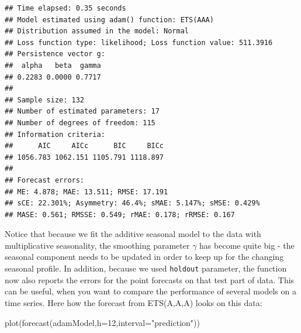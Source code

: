 \documentclass[
]{book}
\newenvironment{Shaded}{\begin{snugshade}}{\end{snugshade}}
\newcommand{\AttributeTok}[1]{\textcolor[rgb]{0.77,0.63,0.00}{#1}}
\newcommand{\ConstantTok}[1]{\textcolor[rgb]{0.00,0.00,0.00}{#1}}
\newcommand{\DecValTok}[1]{\textcolor[rgb]{0.00,0.00,0.81}{#1}}
\newcommand{\FloatTok}[1]{\textcolor[rgb]{0.00,0.00,0.81}{#1}}
\newcommand{\FunctionTok}[1]{\textcolor[rgb]{0.00,0.00,0.00}{#1}}
\newcommand{\NormalTok}[1]{#1}
\newcommand{\OtherTok}[1]{\textcolor[rgb]{0.56,0.35,0.01}{#1}}
\newcommand{\SpecialCharTok}[1]{\textcolor[rgb]{0.00,0.00,0.00}{#1}}
\newcommand{\StringTok}[1]{\textcolor[rgb]{0.31,0.60,0.02}{#1}}
\theoremstyle{definition}
\theoremstyle{definition}
\theoremstyle{definition}
\theoremstyle{definition}
\theoremstyle{remark}
\begin{document}
\begin{Shaded}
\end{Shaded}

\begin{verbatim}
## Time elapsed: 0.35 seconds
## Model estimated using adam() function: ETS(AAA)
## Distribution assumed in the model: Normal
## Loss function type: likelihood; Loss function value: 511.3916
## Persistence vector g:
##  alpha   beta  gamma 
## 0.2283 0.0000 0.7717 
## 
## Sample size: 132
## Number of estimated parameters: 17
## Number of degrees of freedom: 115
## Information criteria:
##      AIC     AICc      BIC     BICc 
## 1056.783 1062.151 1105.791 1118.897 
## 
## Forecast errors:
## ME: 4.878; MAE: 13.511; RMSE: 17.191
## sCE: 22.301%; Asymmetry: 46.4%; sMAE: 5.147%; sMSE: 0.429%
## MASE: 0.561; RMSSE: 0.549; rMAE: 0.178; rRMSE: 0.167
\end{verbatim}

Notice that because we fit the additive seasonal model to the data with multiplicative seasonality, the smoothing parameter \(\gamma\) has become quite big - the seasonal component needs to be updated in order to keep up for the changing seasonal profile. In addition, because we used \texttt{holdout} parameter, the function now also reports the errors for the point forecasts on that test part of data. This can be useful, when you want to compare the performance of several models on a time series. Here how the forecast from ETS(A,A,A) looks on this data:

\begin{Shaded}
\begin{Highlighting}[]
\FunctionTok{plot}\NormalTok{(}\FunctionTok{forecast}\NormalTok{(adamModel,}\AttributeTok{h=}\DecValTok{12}\NormalTok{,}\AttributeTok{interval=}\StringTok{"prediction"}\NormalTok{))}
\end{Highlighting}
\end{Shaded}
\end{document}
